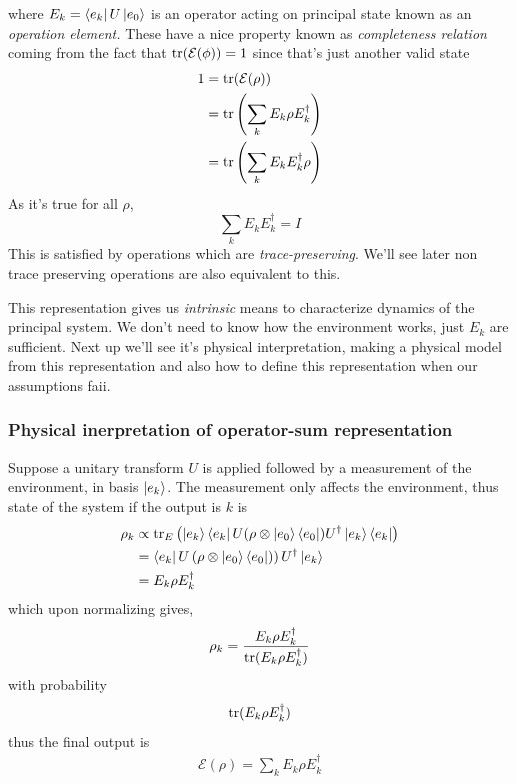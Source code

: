 where $E_k = \bra{e_k} U \ket{e_0}$ is an operator acting on principal state known as an \textit{operation element.} These have a nice property known as \textit{completeness relation} coming from the fact that $\text{tr}(\mathcal{E}(\phi)) = 1$ since that's just another valid state
\begin{align}
    1 &= \text{tr}(\mathcal{E}(\rho )) \\
    &= \text{tr}\left( \sum_k E_k \rho E_k^\dag \right) \\
    &= \text{tr} \left( \sum_k E_k E_k^\dag \rho \right)
\end{align}
As it's true for all $\rho$,
\begin{equation}
    \sum_k E_k E_k^\dag = I
\end{equation}
This is satisfied by operations which are \textit{trace-preserving}. We'll see later non trace preserving operations are also equivalent to this.

This representation gives us \textit{intrinsic} means to characterize dynamics of the principal system. We don't need to know how the environment works, just $E_k$ are sufficient.
Next up we'll see it's physical interpretation, making a physical model from this representation and also how to define this representation when our assumptions faii.

\subsubsection{Physical inerpretation of operator-sum representation}
Suppose a unitary transform $U$ is applied followed by a measurement of the environment, in basis $\ket{e_k}$. The measurement only affects the environment, thus state of the system if the output is $k$ is
\begin{align}
    \rho_k &\propto \text{tr}_E\left( \ket{e_k}\bra{e_k}U(\rho \otimes \ket{e_0}\bra{e_0}) U^\dag \ket{e_k}\bra{e_k} \right) \\
    &= \bra{e_k} U\left( \rho \otimes \ket{e_0}\bra{e_0}) \right) U^\dag \ket{e_k} \\
    &= E_k \rho E_k^\dag
\end{align}
which upon normalizing gives,
\begin{align}
    \rho_k = \frac{E_k\rho E_k^\dag}{\text{tr}(E_k\rho E_k^\dag)}
\end{align}
with probability
\begin{equation}
    \text{tr}(E_k\rho E_k^\dag)
\end{equation}
thus the final output is
\begin{align}
    \mathcal{E}(\rho) = \sum_k E_k\rho E_k^\dag
\end{align}

